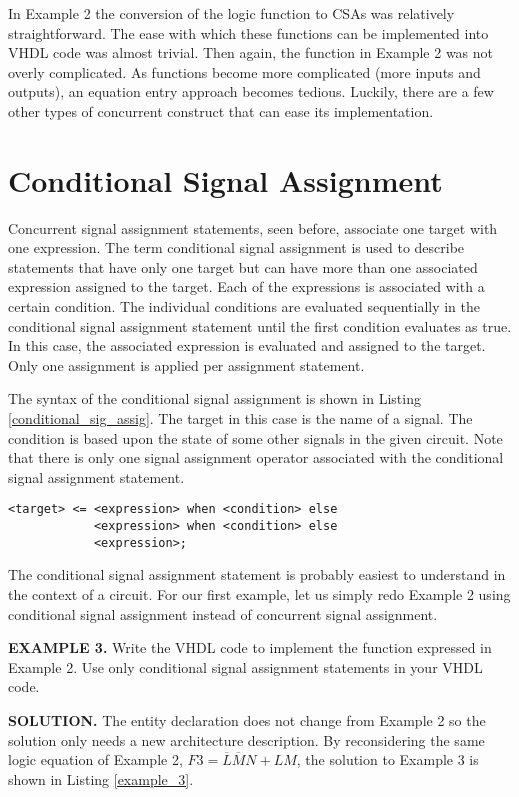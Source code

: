 In Example 2 the conversion of the logic function to CSAs was relatively straightforward. The ease with which these functions can be implemented into VHDL code was almost trivial. Then again, the function in Example 2 was not overly complicated. As functions become more complicated (more inputs and outputs), an equation entry approach becomes tedious. Luckily, there are a few other types of concurrent construct that can ease its implementation.

\section{Conditional Signal Assignment}
Concurrent signal assignment statements, seen before, associate one target with one expression. The term conditional signal assignment is used to describe statements that have only one target but can have more than one associated expression assigned to the target. Each of the expressions is associated with a certain condition. The individual conditions are evaluated sequentially in the conditional signal assignment statement until the first condition evaluates as true. In this case, the associated expression is evaluated and assigned to the target. Only one assignment is applied per assignment statement.

The syntax of the conditional signal assignment is shown in Listing \ref{conditional_sig_assig}. The target in this case is the name of a signal. The condition is based upon the state of some other signals in the given circuit. Note that there is only one signal assignment operator associated with the conditional signal assignment statement.

\begin{lstlisting}[label=conditional_sig_assig, caption=The syntax for the conditional signal assignment statement.]
<target> <=	<expression> when <condition> else
			<expression> when <condition> else
			<expression>;
\end{lstlisting}

The conditional signal assignment statement is probably easiest to understand in the context of a circuit. For our first example, let us simply redo Example 2 using conditional signal assignment instead of concurrent signal assignment.

\newpage\clearpage
\begin{leftbar}
\noindent
\textbf{EXAMPLE 3.}
Write the VHDL code to implement the function expressed in Example 2. Use only conditional signal assignment statements in your VHDL code. 
\end{leftbar}
\noindent
\textbf{SOLUTION.} The entity declaration does not change from Example 2 so the solution only needs a new architecture description. By reconsidering the same logic equation of Example 2, $F3=\overline{L}\overline{M}N+LM$, the solution to Example 3 is shown in Listing \ref{example_3}.

